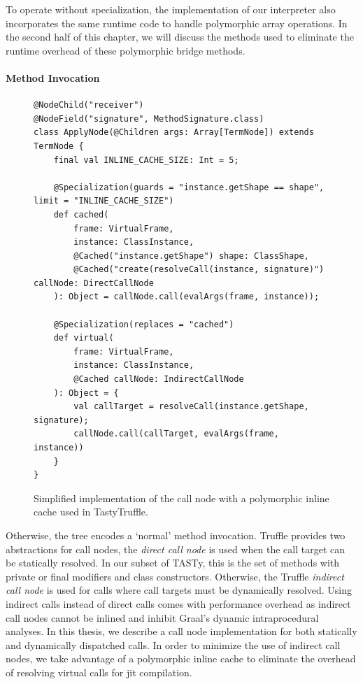 To operate without specialization, the implementation of our interpreter also incorporates the same runtime code to handle polymorphic array operations.
In the second half of this chapter, we will discuss the methods used to eliminate the runtime overhead of these polymorphic bridge methods.

\paragraph{Method Invocation}

\begin{figure}[!htb]
\begin{verbatim}
@NodeChild("receiver")
@NodeField("signature", MethodSignature.class)
class ApplyNode(@Children args: Array[TermNode]) extends TermNode {
	final val INLINE_CACHE_SIZE: Int = 5;
	
	@Specialization(guards = "instance.getShape == shape", limit = "INLINE_CACHE_SIZE")
	def cached(
		frame: VirtualFrame,
		instance: ClassInstance,
		@Cached("instance.getShape") shape: ClassShape,
		@Cached("create(resolveCall(instance, signature)") callNode: DirectCallNode
	): Object = callNode.call(evalArgs(frame, instance));
	
	@Specialization(replaces = "cached")
	def virtual(
		frame: VirtualFrame,
		instance: ClassInstance,
		@Cached callNode: IndirectCallNode
	): Object = {
		val callTarget = resolveCall(instance.getShape, signature);
		callNode.call(callTarget, evalArgs(frame, instance))
	}
}
\end{verbatim}
\caption{Simplified implementation of the call node with a polymorphic inline cache used in TastyTruffle.}
\label{implementation:poly-cache-call-node}
\end{figure}

Otherwise, the  tree encodes a `normal' method invocation.
Truffle provides two abstractions for call nodes, the \textit{direct call node} is used when the call target can be statically resolved. 
In our subset of TASTy, this is the set of methods with private or final modifiers\cite{java:lang-spec} and class constructors. 
Otherwise, the Truffle \textit{indirect call node} is used for calls where call targets must be dynamically resolved. 
Using indirect calls instead of direct calls comes with performance overhead as indirect call nodes cannot be inlined and inhibit Graal's dynamic intraprocedural analyses.
In this thesis, we describe a call node implementation for both statically and dynamically dispatched calls. 
In order to minimize the use of indirect call nodes, we take advantage of a polymorphic inline cache\cite{self:polymorphic-inline-caches} to eliminate the overhead of resolving virtual calls for \acrshort{jit} compilation. 

